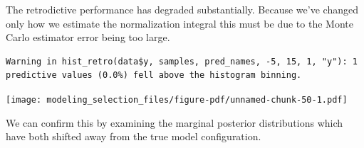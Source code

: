 \documentclass[
  letterpaper,
  DIV=11,
  numbers=noendperiod]{scrartcl}
\newenvironment{Shaded}{\begin{snugshade}}{\end{snugshade}}
\newcommand{\AttributeTok}[1]{\textcolor[rgb]{0.40,0.45,0.13}{#1}}
\newcommand{\ConstantTok}[1]{\textcolor[rgb]{0.56,0.35,0.01}{#1}}
\newcommand{\DecValTok}[1]{\textcolor[rgb]{0.68,0.00,0.00}{#1}}
\newcommand{\FunctionTok}[1]{\textcolor[rgb]{0.28,0.35,0.67}{#1}}
\newcommand{\NormalTok}[1]{\textcolor[rgb]{0.00,0.23,0.31}{#1}}
\newcommand{\OtherTok}[1]{\textcolor[rgb]{0.00,0.23,0.31}{#1}}
\newcommand{\SpecialCharTok}[1]{\textcolor[rgb]{0.37,0.37,0.37}{#1}}
\newcommand{\StringTok}[1]{\textcolor[rgb]{0.13,0.47,0.30}{#1}}
\begin{document}
The retrodictive performance has degraded substantially. Because we've
changed only how we estimate the normalization integral this must be due
to the Monte Carlo estimator error being too large.

\begin{Shaded}
\end{Shaded}

\begin{verbatim}
Warning in hist_retro(data$y, samples, pred_names, -5, 15, 1, "y"): 1
predictive values (0.0%) fell above the histogram binning.
\end{verbatim}

\texttt{[image: modeling\_selection\_files/figure-pdf/unnamed-chunk-50-1.pdf]}

We can confirm this by examining the marginal posterior distributions
which have both shifted away from the true model configuration.
\end{document}
